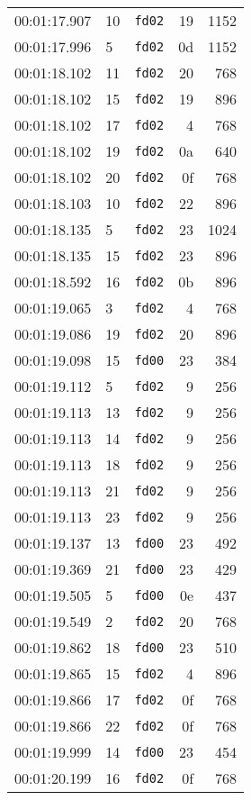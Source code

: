 \documentclass{article}
\begin{document}
\begin{longtable}{lllrr}
00:01:17.907 & 10 & \texttt{fd02} & 19 & 1152 \\
00:01:17.996 & 5 & \texttt{fd02} & 0d & 1152 \\
00:01:18.102 & 11 & \texttt{fd02} & 20 & 768 \\
00:01:18.102 & 15 & \texttt{fd02} & 19 & 896 \\
00:01:18.102 & 17 & \texttt{fd02} & 4 & 768 \\
00:01:18.102 & 19 & \texttt{fd02} & 0a & 640 \\
00:01:18.102 & 20 & \texttt{fd02} & 0f & 768 \\
00:01:18.103 & 10 & \texttt{fd02} & 22 & 896 \\
00:01:18.135 & 5 & \texttt{fd02} & 23 & 1024 \\
00:01:18.135 & 15 & \texttt{fd02} & 23 & 896 \\
00:01:18.592 & 16 & \texttt{fd02} & 0b & 896 \\
00:01:19.065 & 3 & \texttt{fd02} & 4 & 768 \\
00:01:19.086 & 19 & \texttt{fd02} & 20 & 896 \\
00:01:19.098 & 15 & \texttt{fd00} & 23 & 384 \\
00:01:19.112 & 5 & \texttt{fd02} & 9 & 256 \\
00:01:19.113 & 13 & \texttt{fd02} & 9 & 256 \\
00:01:19.113 & 14 & \texttt{fd02} & 9 & 256 \\
00:01:19.113 & 18 & \texttt{fd02} & 9 & 256 \\
00:01:19.113 & 21 & \texttt{fd02} & 9 & 256 \\
00:01:19.113 & 23 & \texttt{fd02} & 9 & 256 \\
00:01:19.137 & 13 & \texttt{fd00} & 23 & 492 \\
00:01:19.369 & 21 & \texttt{fd00} & 23 & 429 \\
00:01:19.505 & 5 & \texttt{fd00} & 0e & 437 \\
00:01:19.549 & 2 & \texttt{fd02} & 20 & 768 \\
00:01:19.862 & 18 & \texttt{fd00} & 23 & 510 \\
00:01:19.865 & 15 & \texttt{fd02} & 4 & 896 \\
00:01:19.866 & 17 & \texttt{fd02} & 0f & 768 \\
00:01:19.866 & 22 & \texttt{fd02} & 0f & 768 \\
00:01:19.999 & 14 & \texttt{fd00} & 23 & 454 \\
00:01:20.199 & 16 & \texttt{fd02} & 0f & 768 \\

\end{longtable}
\end{document}
